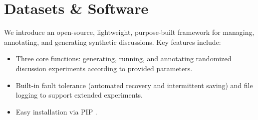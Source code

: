 \section{Datasets \& Software}
\label{sec:data-soft}

We introduce \syndisco\syndiscolink an open-source, lightweight, purpose-built framework for managing, annotating, and generating synthetic discussions. Key features include: 
\begin{itemize}[nosep, noitemsep]
    \item Three core functions: generating, running, and annotating randomized discussion experiments according to provided parameters.
    \item  Built-in fault tolerance (automated recovery and intermittent saving) and file logging to support extended experiments.
    \item Easy installation via PIP \pip.
\end{itemize}

